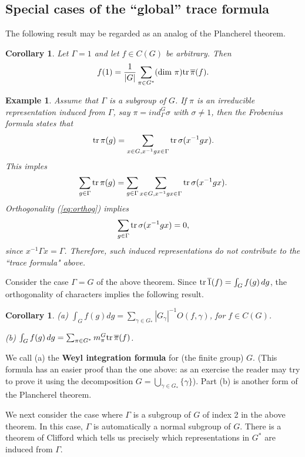 \documentclass[12pt]{article}
\newtheorem{corollary}[theorem]{Corollary}
\newtheorem{example}[theorem]{Example}
\begin{document}
\subsection{Special cases of the ``global'' trace formula}

The following result may be regarded as an analog of
the Plancherel theorem.

\begin{corollary} Let $\Gamma =1$ and let $f\in C(G)$ be arbitrary.
Then
\[
f(1)={1\over |G|}\sum_{\pi\in G^*} 
({\rm dim}\ \pi){\rm tr}\,\overline{\pi}(f).
\]
\end{corollary}

\begin{example} Assume that $\Gamma $ is a subgroup of $G$.
If $\pi$ is an irreducible representation induced from $\Gamma $,
say $\pi=ind_\Gamma ^G\sigma$ with $\sigma\not= 1$, then
the Frobenius formula states that
\[
{\rm tr}\,\pi(g)
=\sum_{x\in G, x^{-1}gx\in \Gamma } {\rm tr}\,\sigma(x^{-1}gx).
\]
This imples 
\[
\sum_{g\in \Gamma } {\rm tr}\,\pi(g)=
\sum_{g\in \Gamma }\sum_{x\in G, x^{-1}gx\in \Gamma } {\rm tr}\,\sigma(x^{-1}gx).
\]
Orthogonality (\ref{eq:orthog}) implies
\[
\sum_{g\in \Gamma }{\rm tr}\,\sigma(x^{-1}gx)=0,
\]
since $x^{-1}\Gamma x= \Gamma $.  Therefore, such induced representations do
not contribute to the ``trace formula" above.
\end{example}

Consider the case $\Gamma =G$ of the above theorem.
Since ${\rm tr}\,\overline{1}(f)=\int_G f(g)\, dg$, the orthogonality of 
characters implies the following result.

\begin{corollary} (a) 
$\int_G f(g) dg = 
\sum_{\gamma\in G_*} |G_\gamma|^{-1} O(f,\gamma)$, for $f\in C(G)$.

(b) $\int_G f(g)\, dg= 
\sum_{\pi\in G^*}
m_\pi^G
 {\rm tr}\,\overline{\pi}(f)$.
\end{corollary}

We call (a) the {\bf Weyl integration formula} for (the finite group) $G$.
(This formula has an easier proof than the one above: as an exercise the
reader may try to prove it using the decomposition
$G=\bigcup_{\gamma\in G_*}\{\gamma\}$). Part (b) is another form of
the Plancherel theorem.

We next consider the case where $\Gamma $ is a subgroup
of $G$ of index 2 in the above theorem. In this case, $\Gamma $ is automatically
a normal subgroup of $G$. There is a theorem of Clifford which tells
us precisely which representations in $G^*$ are induced from $\Gamma $.
\end{document}
